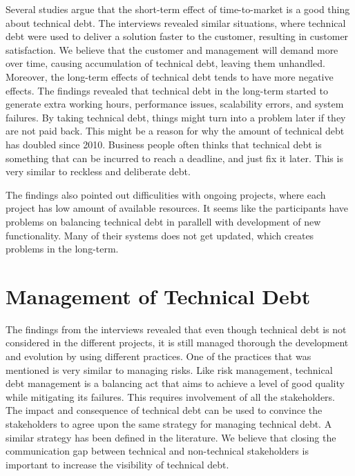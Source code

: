 Several studies argue that the short-term effect of time-to-market is a good thing about technical debt\cite{lim-taksande,p247-siebra}. The interviews revealed similar situations, where technical debt were used to deliver a solution faster to the customer, resulting in customer satisfaction. We believe that the customer and management will demand more over time, causing accumulation of technical debt, leaving them unhandled. Moreover, the long-term effects of technical debt tends to have more negative effects\cite{lim-taksande,p247-siebra,buschmann2011pay}. The findings revealed that technical debt in the long-term started to generate extra working hours, performance issues, scalability errors, and system failures. By taking technical debt, things might turn into a problem later if they are not paid back. This might be a reason for why the amount of technical debt has doubled since 2010\cite{gartner2010}. Business people often thinks that technical debt is something that can be incurred to reach a deadline, and just fix it later. This is very similar to reckless and deliberate debt\cite{url-fowler}.

The findings also pointed out difficulities with ongoing projects, where each project has low amount of available resources. It seems like the participants have problems on balancing technical debt in parallell with development of new functionality. Many of their systems does not get updated, which creates problems in the long-term.







\section{Management of Technical Debt}
The findings from the interviews revealed that even though technical debt is not considered in the different projects, it is still managed thorough the development and evolution by using different practices. One of the practices that was mentioned is very similar to managing risks. Like risk management, technical debt management is a balancing act that aims to achieve a level of good quality while mitigating its failures. This requires involvement of all the stakeholders. The impact and consequence of technical debt can be used to convince the stakeholders to agree upon the same strategy for managing technical debt. A similar strategy has been defined in the literature\cite{lim-taksande,Theodoropoulos:2011:TDS:1985362.1985373}. We believe that closing the communication gap between technical and non-technical stakeholders is important to increase the visibility of technical debt. 

